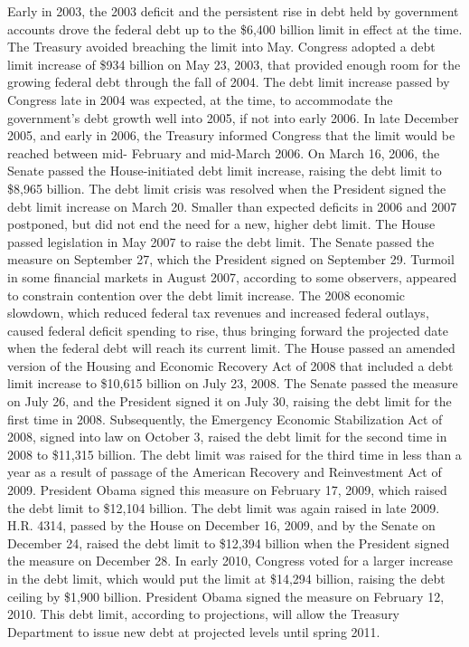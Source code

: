 \nextline
Early in 2003, the 2003 deficit and the persistent rise in debt held by government accounts drove the federal debt up to the \$6,400 billion limit in effect at the time. The Treasury avoided breaching the limit into May. Congress adopted a debt limit increase of \$934 billion on May 23, 2003, that provided enough room for the growing federal debt through the fall of 2004. The debt limit increase passed by Congress late in 2004 was expected, at the time, to accommodate the government’s debt growth well into 2005, if not into early 2006. In late December 2005, and early in 2006, the Treasury informed Congress that the limit would be reached between mid- February and mid-March 2006. On March 16, 2006, the Senate passed the House-initiated debt limit increase, raising the debt limit to \$8,965 billion. The debt limit crisis was resolved when the President signed the debt limit increase on March 20.
\nextline
Smaller than expected deficits in 2006 and 2007 postponed, but did not end the need for a new, higher debt limit. The House passed legislation in May 2007 to raise the debt limit. The Senate passed the measure on September 27, which the President signed on September 29. Turmoil in some financial markets in August 2007, according to some observers, appeared to constrain contention over the debt limit increase.
\nextline
The 2008 economic slowdown, which reduced federal tax revenues and increased federal outlays, caused federal deficit spending to rise, thus bringing forward the projected date when the federal debt will reach its current limit. The House passed an amended version of the Housing and Economic Recovery Act of 2008 that included a debt limit increase to \$10,615 billion on July 23, 2008. The Senate passed the measure on July 26, and the President signed it on July 30, raising the debt limit for the first time in 2008. Subsequently, the Emergency Economic Stabilization Act of 2008, signed into law on October 3, raised the debt limit for the second time in 2008 to \$11,315 billion. The debt limit was raised for the third time in less than a year as a result of passage of the American Recovery and Reinvestment Act of 2009. President Obama signed this measure on February 17, 2009, which raised the debt limit to \$12,104 billion.
\nextline
The debt limit was again raised in late 2009. H.R. 4314, passed by the House on December 16, 2009, and by the Senate on December 24, raised the debt limit to \$12,394 billion when the President signed the measure on December 28. In early 2010, Congress voted for a larger increase in the debt limit, which would put the limit at \$14,294 billion, raising the debt ceiling by \$1,900 billion. President Obama signed the measure on February 12, 2010. This debt limit, according to projections, will allow the Treasury Department to issue new debt at projected levels until spring 2011.
